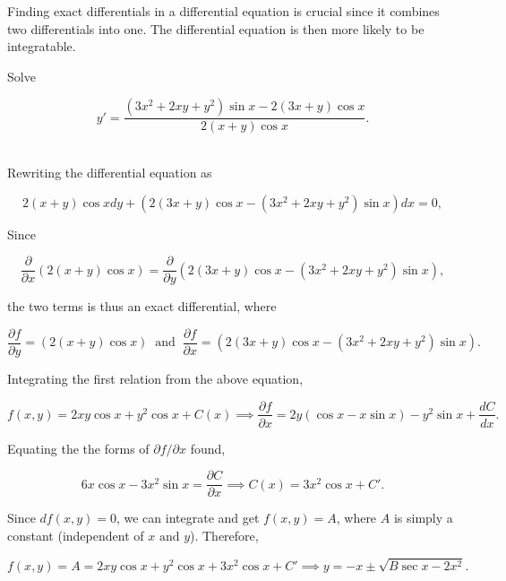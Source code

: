 \documentclass[english,a4paper,12pt]{report}
\begin{document}
Finding exact differentials in a differential equation is crucial since it combines two differentials into one. The differential equation is then more likely to be integratable.


{Solve 

\begin{equation}
    y' = \frac{(3x^2+2xy+y^2)\sin x-2(3x+y)\cos x}{2(x+y)\cos x} .
\end{equation}~}
{Rewriting the differential equation as

\begin{equation}
    2(x+y)\cos xdy+(2(3x+y)\cos x-(3x^2+2xy+y^2)\sin x)dx = 0,
\end{equation}

Since

\begin{equation}
    \frac{\partial }{\partial x} (2(x+y)\cos x) = \frac{\partial }{\partial y} (2(3x+y)\cos x-(3x^2+2xy+y^2)\sin x),
\end{equation}

the two terms is thus an exact differential, where

\begin{equation}
    \frac{\partial f}{\partial y} = (2(x+y)\cos x) ~\text { and }~ \frac{\partial f}{\partial x} = (2(3x+y)\cos x-(3x^2+2xy+y^2)\sin x).
\end{equation}

Integrating the first relation from the above equation,

\begin{equation}
    f(x,y) = 2xy\cos x + y^2\cos x + C(x) \implies \frac{\partial f}{\partial x} = 2y(\cos x-x\sin x)-y^2\sin x+\frac{dC}{dx} .
\end{equation}

Equating the the forms of \(\partial f /\partial x \) found, 

\begin{equation}
    6x\cos x-3x^2\sin x = \frac{\partial C}{\partial x} \implies C(x) = 3x^2\cos x+ C'.
\end{equation}

Since \(df(x,y) = 0\), we can integrate and get \(f(x,y) = A\), where \(A\) is simply a constant (independent of \(x \text { and } y\)). Therefore, 

\begin{equation}
    f(x,y) = A = 2xy\cos x+y^2\cos x+3x^2\cos x+C' \implies y = -x \pm \sqrt{B \sec x - 2x^2}. 
\end{equation}~
} 
\end{document}
